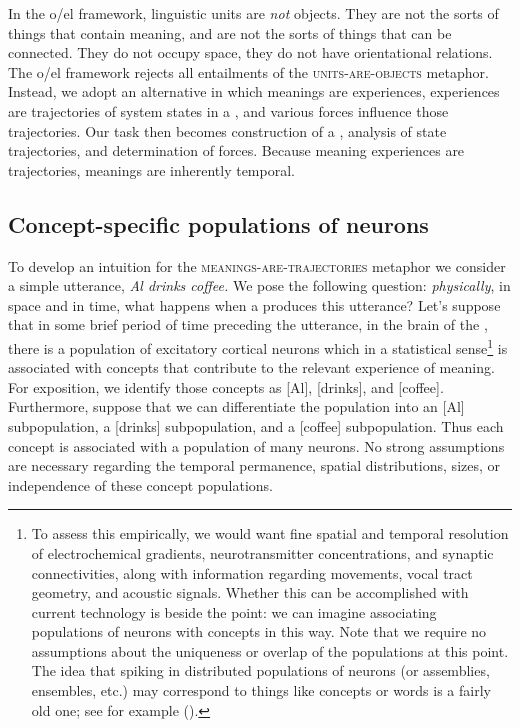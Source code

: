   In the o/el framework, linguistic units are \textit{not} objects. They are not the sorts of things that contain meaning, and are not the sorts of things that can be connected. They do not occupy space, they do not have orientational relations. The o/el framework rejects all entailments of the \textsc{units}\textsc{{}-are-}\textsc{objects} metaphor. Instead, we adopt an alternative in which meanings are experiences, experiences are trajectories of system states in a , and various forces influence those trajectories. Our task then becomes construction of a , analysis of state trajectories, and determination of forces. Because meaning experiences are trajectories, meanings are inherently temporal. 

\subsection{Concept-specific populations of neurons}

To develop an intuition for the \textsc{meanings}\textsc{{}-are-}\textsc{trajectories} metaphor we consider a simple utterance, \textit{Al drinks coffee.} We pose the following question: \textit{physically}, in space and in time, what happens when a  produces this utterance? Let's suppose that in some brief period of time preceding the utterance, in the brain of the , there is a population of excitatory cortical neurons which in a statistical sense\footnote{To assess this empirically, we would want fine spatial and temporal resolution of electrochemical gradients, neurotransmitter concentrations, and synaptic connectivities, along with information regarding  movements, vocal tract geometry, and acoustic signals. Whether this can be accomplished with current technology is beside the point: we can imagine associating populations of neurons with concepts in this way. Note that we require no assumptions about the uniqueness or overlap of the populations at this point. The idea that spiking in distributed populations of neurons (or assemblies, ensembles, etc.) may correspond to things like concepts or words is a fairly old one; see for example (\citealt{Abeles2012,Braitenberg1978,Hebb1949,pulvermuller1999}).} is associated with concepts that contribute to the relevant experience of meaning. For exposition, we identify those concepts as [Al], [drinks], and [coffee]. Furthermore, suppose that we can differentiate the population into an [Al] subpopulation, a [drinks] subpopulation, and a [coffee] subpopulation. Thus each concept is associated with a population of many neurons. No strong assumptions are necessary regarding the temporal permanence, spatial distributions, sizes, or independence of these concept populations.

